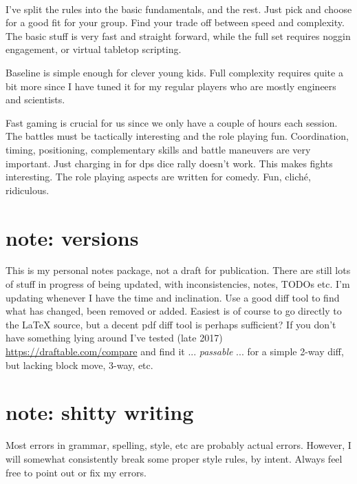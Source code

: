 \documentclass[11pt, twoside, titlepage, a4paper]{report}
\newcommand{\vvsmall}{\scriptsize}   %
\begin{document}

\

I've split the rules into the basic fundamentals, and the rest. Just pick and choose for a good fit for your group. Find your trade off between speed and complexity. The basic stuff is very fast and straight forward, while the full set requires noggin engagement, or virtual tabletop scripting.

Baseline is simple enough for clever young kids. Full complexity requires quite a bit more since I have tuned it for my regular players who are mostly engineers and scientists.

Fast gaming is crucial for us since we only have a couple of hours each session. The battles must be tactically interesting and the role playing fun. Coordination, timing, positioning, complementary skills and battle maneuvers are very important. Just charging in for dps dice rally doesn't work. This makes fights interesting. The role playing aspects are written for comedy. Fun, cliché, ridiculous.



\clearpage
\thispagestyle{empty}
\section*{note: versions}
This is my personal notes package, not a draft for publication. There are still lots of stuff in progress of being updated, with inconsistencies, notes, TODOs etc.
I'm updating whenever I have the time and inclination. Use a good diff tool to find what has changed, been removed or added. Easiest is of course to go directly to the \LaTeX{} source, but a decent pdf diff tool is perhaps sufficient? If you don't have something lying around I've tested
\vvsmall(late 2017)\normalsize~
\url{https://draftable.com/compare}
and find it ... \emph{passable} ... for a simple 2-way diff, but lacking block move, 3-way, etc.


\section*{note: shitty writing}
Most errors in grammar, spelling, style, etc are probably actual errors. However, I will somewhat consistently break some proper style rules, by intent. Always feel free to point out or fix my errors.
\end{document}
